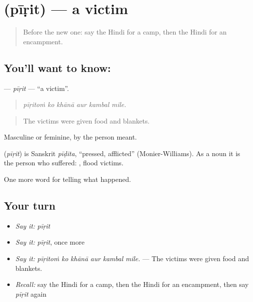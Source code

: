 \section[\texorpdfstring{\hi{पीड़ित} (pīṛit)}{पीड़ित (pīṛit)}]{ (pīṛit) — a victim}

\label{lesson:HI-C309-pirit}



\begin{quote}
Before the new one: say the Hindi for a camp, then the Hindi for an encampment.
\end{quote}

\subsection*{You'll want to know: }
\textbf{} — \emph{pīṛit} — \textquotedblleft{}a victim\textquotedblright{}.

\begin{quote}
     
\end{quote}

\begin{quote}
\emph{pīṛitoṁ ko khānā aur kambal mile.}
\end{quote}

\begin{quote}
The victims were given food and blankets.
\end{quote}

Masculine or feminine, by the person meant.

\begin{cousinweb}
\textbf{} (\emph{pīṛit}) is Sanskrit \emph{pīḍita}, \textquotedblleft{}pressed, afflicted\textquotedblright{} (Monier-Williams). As a noun it is the person who suffered: \textbf{ }, flood victims.
\end{cousinweb}

\begin{grammarlens}[title={What you've built}]
One more word for telling what happened.
\end{grammarlens}

\subsection*{Your turn}
\begin{itemize}
\raggedright
  \item \emph{Say it:} \emph{pīṛit}
  \item \emph{Say it:} \emph{pīṛit}, once more
  \item \emph{Say it:} \emph{pīṛitoṁ ko khānā aur kambal mile.} — The victims were given food and blankets.
  \item \emph{Recall:} say the Hindi for a camp, then the Hindi for an encampment, then say \emph{pīṛit} again
\end{itemize}

